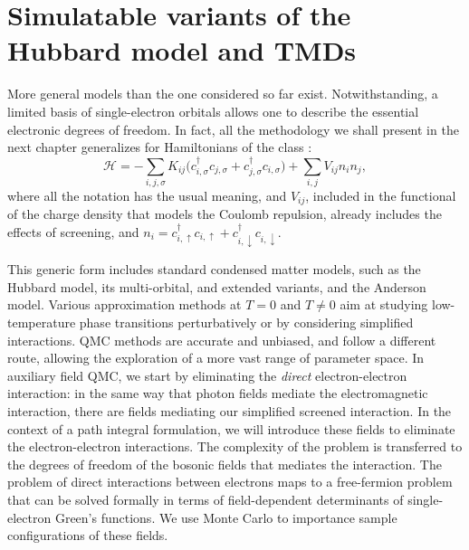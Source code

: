 \section{Simulatable variants of the Hubbard model and TMDs}\label{sec:variants}

More general  models than the one considered so far exist.
Notwithstanding, a limited basis of single-electron orbitals allows one to describe the essential electronic degrees of freedom.
In fact, all the methodology we shall present in the next chapter generalizes for Hamiltonians of the class \cite{hanke_electronic_nodate}:
\begin{equation}\label{eq:variantsForm}
\mathcal{H} = - \sum_{i, j, \sigma} K_{ij} \bigg( c_{i, \sigma}^\dagger c_{j, \sigma} + c_{j, \sigma}^\dagger c_{i, \sigma} \bigg) + \sum_{i, j} V_{ij} n_i n_j ,
\end{equation}
where all the notation has the usual meaning, and $V_{ij}$, included in the functional of the charge density that models the Coulomb repulsion, already includes the effects of screening, and $n_i = c_{i,\uparrow}^\dagger c_{i,\uparrow} + c_{i,\downarrow}^\dagger c_{i,\downarrow}$.

This generic form includes standard condensed matter models, such as the Hubbard model, its multi-orbital, and extended variants, and the Anderson model.
Various approximation methods at $T = 0$ and $T \neq 0$ aim at studying low-temperature phase transitions perturbatively or by considering simplified interactions.
\ac{QMC} methods are accurate and unbiased, and follow a different route, allowing the exploration of a more vast range of parameter space.
In auxiliary field \ac{QMC}, we start by eliminating the \emph{direct} electron-electron interaction: in the same way that photon fields mediate the electromagnetic interaction, there are fields mediating our simplified screened interaction.
In the context of a path integral formulation, we will introduce these fields to eliminate the electron-electron interactions.
The complexity of the problem is transferred to the degrees of freedom of the bosonic fields that mediates the interaction.
The problem of direct interactions between electrons maps to a free-fermion problem that can be solved formally in terms of field-dependent determinants of single-electron Green's functions.
We use Monte Carlo to importance sample configurations of these fields.

